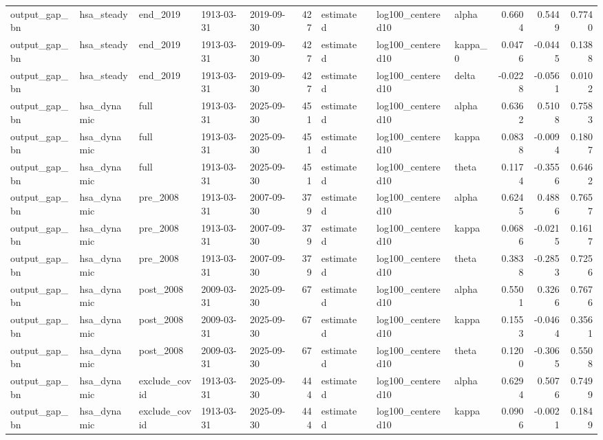 \begin{tabular}{lllllrllllrrr}
output\_gap\_bn & hsa\_steady & end\_2019 & 1913-03-31 & 2019-09-30 & 427 & estimated &  & log100\_centered10 & alpha & 0.6604 & 0.5449 & 0.7740 \\
output\_gap\_bn & hsa\_steady & end\_2019 & 1913-03-31 & 2019-09-30 & 427 & estimated &  & log100\_centered10 & kappa\_0 & 0.0476 & -0.0445 & 0.1388 \\
output\_gap\_bn & hsa\_steady & end\_2019 & 1913-03-31 & 2019-09-30 & 427 & estimated &  & log100\_centered10 & delta & -0.0228 & -0.0561 & 0.0102 \\
output\_gap\_bn & hsa\_dynamic & full & 1913-03-31 & 2025-09-30 & 451 & estimated &  & log100\_centered10 & alpha & 0.6362 & 0.5108 & 0.7583 \\
output\_gap\_bn & hsa\_dynamic & full & 1913-03-31 & 2025-09-30 & 451 & estimated &  & log100\_centered10 & kappa & 0.0838 & -0.0094 & 0.1807 \\
output\_gap\_bn & hsa\_dynamic & full & 1913-03-31 & 2025-09-30 & 451 & estimated &  & log100\_centered10 & theta & 0.1174 & -0.3556 & 0.6462 \\
output\_gap\_bn & hsa\_dynamic & pre\_2008 & 1913-03-31 & 2007-09-30 & 379 & estimated &  & log100\_centered10 & alpha & 0.6245 & 0.4886 & 0.7657 \\
output\_gap\_bn & hsa\_dynamic & pre\_2008 & 1913-03-31 & 2007-09-30 & 379 & estimated &  & log100\_centered10 & kappa & 0.0686 & -0.0215 & 0.1617 \\
output\_gap\_bn & hsa\_dynamic & pre\_2008 & 1913-03-31 & 2007-09-30 & 379 & estimated &  & log100\_centered10 & theta & 0.3838 & -0.2853 & 0.7256 \\
output\_gap\_bn & hsa\_dynamic & post\_2008 & 2009-03-31 & 2025-09-30 & 67 & estimated &  & log100\_centered10 & alpha & 0.5501 & 0.3266 & 0.7676 \\
output\_gap\_bn & hsa\_dynamic & post\_2008 & 2009-03-31 & 2025-09-30 & 67 & estimated &  & log100\_centered10 & kappa & 0.1553 & -0.0464 & 0.3561 \\
output\_gap\_bn & hsa\_dynamic & post\_2008 & 2009-03-31 & 2025-09-30 & 67 & estimated &  & log100\_centered10 & theta & 0.1200 & -0.3065 & 0.5508 \\
output\_gap\_bn & hsa\_dynamic & exclude\_covid & 1913-03-31 & 2025-09-30 & 444 & estimated &  & log100\_centered10 & alpha & 0.6294 & 0.5076 & 0.7499 \\
output\_gap\_bn & hsa\_dynamic & exclude\_covid & 1913-03-31 & 2025-09-30 & 444 & estimated &  & log100\_centered10 & kappa & 0.0906 & -0.0021 & 0.1849 \\

\end{tabular}

